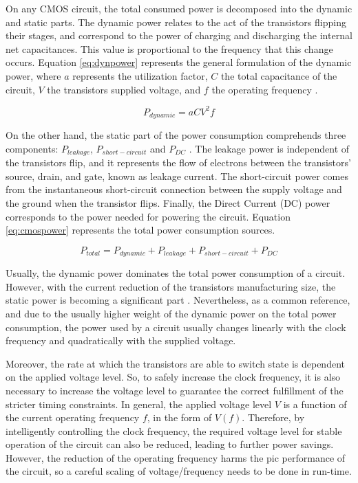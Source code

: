 On any CMOS circuit, the total consumed power is decomposed into the dynamic and static parts. The dynamic power relates to the act of the transistors flipping their stages, and correspond to the power of charging and discharging the internal net capacitances. This value is proportional to the frequency that this change occurs. Equation \ref{eq:dynpower} represents the general formulation of the dynamic power, where $a$ represents the utilization factor, $C$ the total capacitance of the circuit, $V$ the transistors supplied voltage, and $f$ the operating frequency \cite{gonzalez_supply_1997}.

\begin{equation}
    P_{dynamic} = aCV^2f
    \label{eq:dynpower}
\end{equation}


On the other hand, the static part of the power consumption comprehends three components: $P_{leakage}$, $P_{short-circuit}$ and $P_{DC}$ \cite{mei_survey_2016}. The leakage power is independent of the transistors flip, and it represents the flow of electrons between the transistors' source, drain, and gate, known as leakage current. The short-circuit power comes from the instantaneous short-circuit connection between the supply voltage and the ground when the transistor flips. Finally, the Direct Current (DC) power corresponds to the power needed for powering the circuit. Equation \ref{eq:cmospower} represents the total power consumption sources.

\begin{equation}
    P_{total} = P_{dynamic} + P_{leakage} + P_{short-circuit} + P_{DC}
    \label{eq:cmospower}
\end{equation}

Usually, the dynamic power dominates the total power consumption of a circuit. However, with the current reduction of the transistors manufacturing size, the static power is becoming a significant part \cite{s._hong_modeling_2012} \cite{hong_integrated_2010}. Nevertheless, as a common reference, and due to the usually higher weight of the dynamic power on the total power consumption, the power used by a circuit usually changes linearly with the clock frequency and quadratically with the supplied voltage.

Moreover, the rate at which the transistors are able to switch state is dependent on the applied voltage level. So, to safely increase the clock frequency, it is also necessary to increase the voltage level to guarantee the correct fulfillment of the stricter timing constraints. In general, the applied voltage level $V$ is a function of the current operating frequency $f$, in the form of $V(f)$. Therefore, by intelligently controlling the clock frequency, the required voltage level for stable operation of the circuit can also be reduced, leading to further power savings. However, the reduction of the operating frequency harms the pic performance of the circuit, so a careful scaling of voltage/frequency needs to be done in run-time. 

